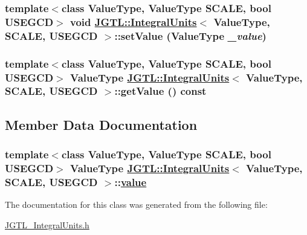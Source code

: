 \hypertarget{class_j_g_t_l_1_1_integral_units_48ec23dc962dd95e11f6ff0b3ef76084}{
\subsubsection[setValue]{\setlength{\rightskip}{0pt plus 5cm}template$<$class Value\-Type, Value\-Type SCALE, bool USEGCD$>$ void \hyperlink{class_j_g_t_l_1_1_integral_units}{JGTL::Integral\-Units}$<$ Value\-Type, SCALE, USEGCD $>$::set\-Value (Value\-Type {\em \_\-value})}}
\label{class_j_g_t_l_1_1_integral_units_48ec23dc962dd95e11f6ff0b3ef76084}


\hypertarget{class_j_g_t_l_1_1_integral_units_38c178cd9a819a246614696fd8c9f982}{
\subsubsection[getValue]{\setlength{\rightskip}{0pt plus 5cm}template$<$class Value\-Type, Value\-Type SCALE, bool USEGCD$>$ Value\-Type \hyperlink{class_j_g_t_l_1_1_integral_units}{JGTL::Integral\-Units}$<$ Value\-Type, SCALE, USEGCD $>$::get\-Value () const}}
\label{class_j_g_t_l_1_1_integral_units_38c178cd9a819a246614696fd8c9f982}




\subsection{Member Data Documentation}
\hypertarget{class_j_g_t_l_1_1_integral_units_dd460e258138ea7485333fda3cfd8cd1}{
\subsubsection[value]{\setlength{\rightskip}{0pt plus 5cm}template$<$class Value\-Type, Value\-Type SCALE, bool USEGCD$>$ Value\-Type \hyperlink{class_j_g_t_l_1_1_integral_units}{JGTL::Integral\-Units}$<$ Value\-Type, SCALE, USEGCD $>$::\hyperlink{class_j_g_t_l_1_1_integral_units_dd460e258138ea7485333fda3cfd8cd1}{value}}}
\label{class_j_g_t_l_1_1_integral_units_dd460e258138ea7485333fda3cfd8cd1}




The documentation for this class was generated from the following file:\begin{CompactItemize}
\item 
\hyperlink{_j_g_t_l___integral_units_8h}{JGTL\_\-Integral\-Units.h}\end{CompactItemize}
